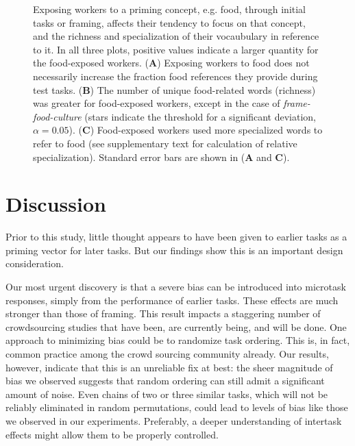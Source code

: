 \documentclass{pnastwo}
\begin{document}
\begin{article}
\begin{figure}[h]
	\caption{
		Exposing workers to a priming concept, e.g. food, through
		initial tasks or framing, affects their tendency to focus
		on that concept, and the richness and specialization of their 
		vocaubulary in reference to it.
		In all three plots, positive values indicate a larger quantity for 
		the food-exposed workers.
		(\textbf{A}) Exposing workers to food does not necessarily increase
		the fraction food references they provide during test tasks.
		(\textbf{B}) The number of unique food-related
		words (richness) was greater for food-exposed workers, except in the 
		case of \textit{frame-food-culture} (stars indicate the threshold
		for a significant deviation, $\alpha=0.05$). 
		(\textbf{C}) Food-exposed
		workers used more specialized words to refer to food (see 
		supplementary text for calculation of relative specialization).
		Standard error bars are shown in (\textbf{A} and \textbf{C}).
	}
	\label{fig:specificity}
\end{figure}

\section{Discussion}

Prior to this study, little thought appears to have been given to earlier tasks
as a priming vector for later tasks.  But our findings show this is an
important design consideration. 

Our most urgent discovery is that a severe bias can be introduced into
microtask responses, simply from the performance of earlier tasks.  These
effects are much stronger than those of framing. This result impacts a
staggering number of crowdsourcing studies that have been, are currently being,
and will be done.  One approach to minimizing bias could be to randomize task
ordering. This is, in fact, common practice among the crowd sourcing
community already.  Our results, however, indicate that this is an unreliable fix
at best: the sheer magnitude of bias we observed suggests that random ordering
can still admit a significant amount of noise.  Even chains of two or three
similar tasks, which will not be reliably eliminated in random permutations,
could lead to levels of bias like those we observed in our experiments.
Preferably, a deeper understanding of intertask effects might allow them to be
properly controlled.


\end{article}
\end{document}
